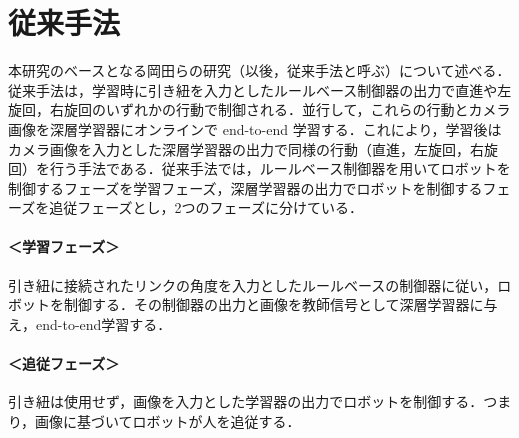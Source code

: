 \chapter{従来手法}

  本研究のベースとなる岡田らの研究（以後，従来手法と呼ぶ）について述べる．従来手法は，学習時に引き紐を入力としたルールベース制御器の出力で直進や左旋回，右旋回のいずれかの行動で制御される．並行して，これらの行動とカメラ画像を深層学習器にオンラインで end-to-end 学習する．これにより，学習後はカメラ画像を入力とした深層学習器の出力で同様の行動（直進，左旋回，右旋回）を行う手法である．従来手法では，ルールベース制御器を用いてロボットを制御するフェーズを学習フェーズ，深層学習器の出力でロボットを制御するフェーズを追従フェーズとし，2つのフェーズに分けている．

  \subsubsection*{＜学習フェーズ＞}
  引き紐に接続されたリンクの角度を入力としたルールベースの制御器に従い，ロボットを制御する．その制御器の出力と画像を教師信号として深層学習器に与え，end-to-end学習する．
  
  \subsubsection*{＜追従フェーズ＞}
  引き紐は使用せず，画像を入力とした学習器の出力でロボットを制御する．つまり，画像に基づいてロボットが人を追従する．

\newpage

\label{chap:trajectory}
%





%

